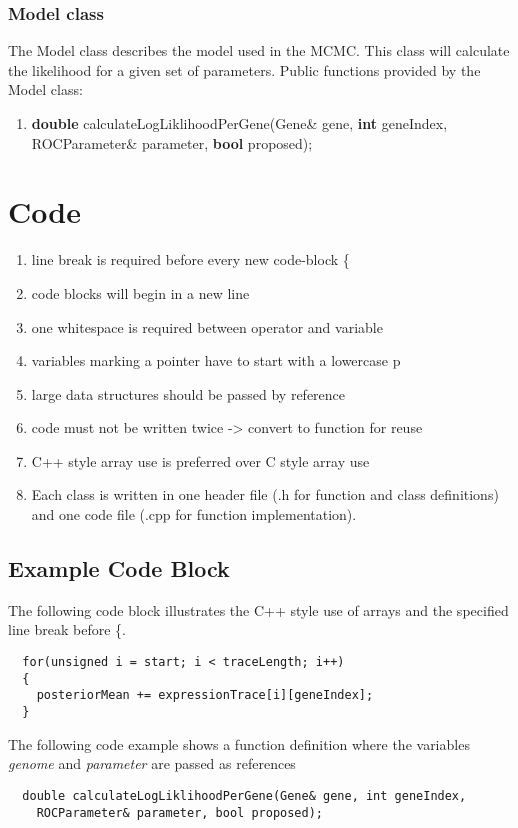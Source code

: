 \documentclass[11pt]{article}
\begin{document}
  \subsubsection{Model class}
  The Model class describes the model used in the MCMC. This class will calculate the likelihood for a given set of parameters.
  \newline
  Public functions provided by the Model class:
  \begin{enumerate}
   \item \textbf{double} calculateLogLiklihoodPerGene(Gene\& gene, \textbf{int} geneIndex, ROCParameter\& parameter, \textbf{bool} proposed);
  \end{enumerate}

  
  
  \section{Code}
  \begin{enumerate}
    \item line break is required before every new code-block \{
    \item code blocks will begin in a new line
    \item one whitespace is required between operator and variable
    \item variables marking a pointer have to start with a lowercase p
    \item large data structures should be passed by reference
    \item code must not be written twice -> convert to function for reuse
    \item C++ style array use is preferred over C style array use
    \item Each class is written in one header file (.h for function and class definitions) and one code file (.cpp for function implementation).
  \end{enumerate}

  \subsection{Example Code Block}
  The following code block illustrates the C++ style use of arrays and the specified line break before \{.
  \begin{verbatim}
  for(unsigned i = start; i < traceLength; i++)
  {
    posteriorMean += expressionTrace[i][geneIndex];
  } 
  \end{verbatim}
  The following code example shows a function definition where the variables \textit{genome} and \textit{parameter} are passed as references
  \begin{verbatim}
  double calculateLogLiklihoodPerGene(Gene& gene, int geneIndex, 
    ROCParameter& parameter, bool proposed);  
  \end{verbatim}


 
 
\end{document}
